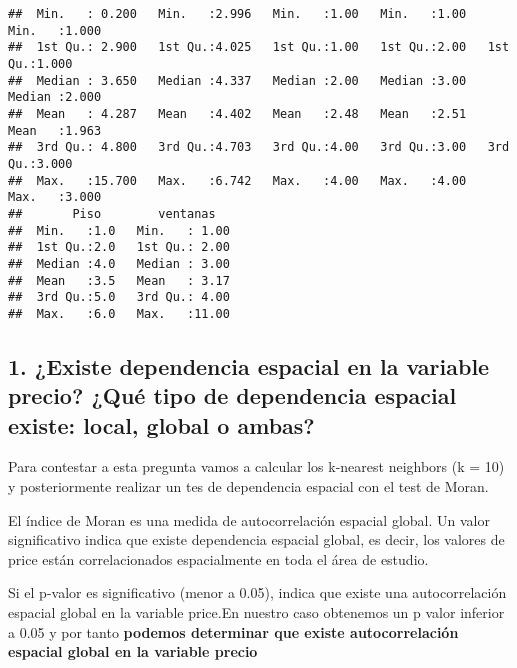\documentclass[
]{article}
\newenvironment{Shaded}{\begin{snugshade}}{\end{snugshade}}
\newcommand{\AttributeTok}[1]{\textcolor[rgb]{0.13,0.29,0.53}{#1}}
\newcommand{\DecValTok}[1]{\textcolor[rgb]{0.00,0.00,0.81}{#1}}
\newcommand{\FunctionTok}[1]{\textcolor[rgb]{0.13,0.29,0.53}{\textbf{#1}}}
\newcommand{\NormalTok}[1]{#1}
\newcommand{\OtherTok}[1]{\textcolor[rgb]{0.56,0.35,0.01}{#1}}
\newcommand{\SpecialCharTok}[1]{\textcolor[rgb]{0.81,0.36,0.00}{\textbf{#1}}}
\newcommand{\StringTok}[1]{\textcolor[rgb]{0.31,0.60,0.02}{#1}}
\begin{document}
\begin{verbatim}
##  Min.   : 0.200   Min.   :2.996   Min.   :1.00   Min.   :1.00   Min.   :1.000  
##  1st Qu.: 2.900   1st Qu.:4.025   1st Qu.:1.00   1st Qu.:2.00   1st Qu.:1.000  
##  Median : 3.650   Median :4.337   Median :2.00   Median :3.00   Median :2.000  
##  Mean   : 4.287   Mean   :4.402   Mean   :2.48   Mean   :2.51   Mean   :1.963  
##  3rd Qu.: 4.800   3rd Qu.:4.703   3rd Qu.:4.00   3rd Qu.:3.00   3rd Qu.:3.000  
##  Max.   :15.700   Max.   :6.742   Max.   :4.00   Max.   :4.00   Max.   :3.000  
##       Piso        ventanas    
##  Min.   :1.0   Min.   : 1.00  
##  1st Qu.:2.0   1st Qu.: 2.00  
##  Median :4.0   Median : 3.00  
##  Mean   :3.5   Mean   : 3.17  
##  3rd Qu.:5.0   3rd Qu.: 4.00  
##  Max.   :6.0   Max.   :11.00
\end{verbatim}

\subsection{1. ¿Existe dependencia espacial en la variable precio? ¿Qué
tipo de dependencia espacial existe: local, global o
ambas?}\label{existe-dependencia-espacial-en-la-variable-precio-quuxe9-tipo-de-dependencia-espacial-existe-local-global-o-ambas}

Para contestar a esta pregunta vamos a calcular los k-nearest neighbors
(k = 10) y posteriormente realizar un tes de dependencia espacial con el
test de Moran.

El índice de Moran es una medida de autocorrelación espacial global. Un
valor significativo indica que existe dependencia espacial global, es
decir, los valores de price están correlacionados espacialmente en toda
el área de estudio.

Si el p-valor es significativo (menor a 0.05), indica que existe una
autocorrelación espacial global en la variable price.En nuestro caso
obtenemos un p valor inferior a 0.05 y por tanto \textbf{podemos
determinar que existe autocorrelación espacial global en la variable
precio}

\begin{Shaded}
\end{Shaded}
\end{document}
